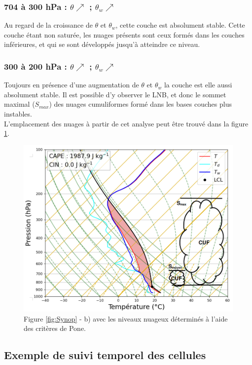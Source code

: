 \documentclass[12pt]{article}
\begin{document}
\subsubsection*{704 à 300 hPa : $\theta \nearrow$ ; $\theta_w \nearrow$}

Au regard de la croissance de $\theta$ et $\theta_w$, cette couche est absolument stable. Cette couche étant non saturée, les nuages présents sont ceux formés dans les couches inférieures, et qui se sont développés jusqu'à atteindre ce niveau.

\subsubsection*{300 à 200 hPa : $\theta \nearrow$ ; $\theta_w \nearrow$}

 Toujours en présence d'une augmentation de $\theta$ et $\theta_w$ la couche est elle aussi absolument stable. Il est possible d'y observer le LNB, et donc le sommet maximal ($S_{max}$) des nuages cumuliformes formé dans les bases couches plus instables. \\

\noindent L'emplacement des nuages à partir de cet analyse peut être trouvé dans la figure \ref{fig:analyse_pone}.

\begin{figure}[H]
    \centering
    \includegraphics[width=0.8\linewidth]{Figures/Analyse_Emagramme.png}
    \caption{Figure \ref{fig:Synop} - b) avec les niveaux nuageux déterminés à l'aide des critères de Pone.}
    \label{fig:analyse_pone}
\end{figure}

\newpage

\subsection{Exemple de suivi temporel des cellules}
\label{sec:sec61}
\end{document}
